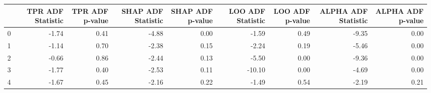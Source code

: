 \begin{tabular}{lrrrrrrrr}
\toprule
 & TPR ADF Statistic & TPR ADF p-value & SHAP ADF Statistic & SHAP ADF p-value & LOO ADF Statistic & LOO ADF p-value & ALPHA ADF Statistic & ALPHA ADF p-value \\
\midrule
0 & -1.74 & 0.41 & -4.88 & 0.00 & -1.59 & 0.49 & -9.35 & 0.00 \\
1 & -1.14 & 0.70 & -2.38 & 0.15 & -2.24 & 0.19 & -5.46 & 0.00 \\
2 & -0.66 & 0.86 & -2.44 & 0.13 & -5.50 & 0.00 & -9.36 & 0.00 \\
3 & -1.77 & 0.40 & -2.53 & 0.11 & -10.10 & 0.00 & -4.69 & 0.00 \\
4 & -1.67 & 0.45 & -2.16 & 0.22 & -1.49 & 0.54 & -2.19 & 0.21 \\
\bottomrule
\end{tabular}
